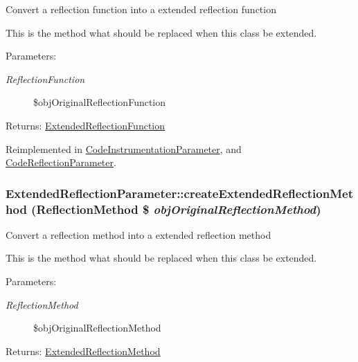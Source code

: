 Convert a reflection function into a extended reflection function

This is the method what should be replaced when this class be extended.

\begin{Desc}
\item[Parameters:]
\begin{description}
\item[{\em ReflectionFunction}]\$objOriginalReflectionFunction \end{description}
\end{Desc}
\begin{Desc}
\item[Returns:]\hyperlink{class_extended_reflection_function}{ExtendedReflectionFunction} \end{Desc}


Reimplemented in \hyperlink{class_code_instrumentation_parameter_e9723a389b48bdb31fc49f784692aecf}{CodeInstrumentationParameter}, and \hyperlink{class_code_reflection_parameter_5e6e7a1f49ff1f404342a2b2d4a15aa3}{CodeReflectionParameter}.\hypertarget{class_extended_reflection_parameter_fc7cab8ac6553754c4c4c62ba8be8685}{
\subsubsection[{createExtendedReflectionMethod}]{\setlength{\rightskip}{0pt plus 5cm}ExtendedReflectionParameter::createExtendedReflectionMethod (ReflectionMethod \$ {\em objOriginalReflectionMethod})}}
\label{class_extended_reflection_parameter_fc7cab8ac6553754c4c4c62ba8be8685}


Convert a reflection method into a extended reflection method

This is the method what should be replaced when this class be extended.

\begin{Desc}
\item[Parameters:]
\begin{description}
\item[{\em ReflectionMethod}]\$objOriginalReflectionMethod \end{description}
\end{Desc}
\begin{Desc}
\item[Returns:]\hyperlink{class_extended_reflection_method}{ExtendedReflectionMethod} \end{Desc}


